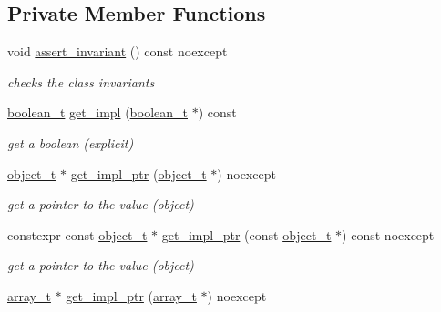 \subsection*{Private Member Functions}
\begin{DoxyCompactItemize}
\item 
void \hyperlink{classnlohmann_1_1basic__json_a4a82d3fb7a111641decf35c2fb707c7f}{assert\+\_\+invariant} () const noexcept
\begin{DoxyCompactList}\small\item\em checks the class invariants \end{DoxyCompactList}\item 
\hyperlink{classnlohmann_1_1basic__json_a4c919102a9b4fe0d588af64801436082}{boolean\+\_\+t} \hyperlink{classnlohmann_1_1basic__json_acb296a56f69c396e2c2a898f2043c834}{get\+\_\+impl} (\hyperlink{classnlohmann_1_1basic__json_a4c919102a9b4fe0d588af64801436082}{boolean\+\_\+t} $\ast$) const 
\begin{DoxyCompactList}\small\item\em get a boolean (explicit) \end{DoxyCompactList}\item 
\hyperlink{classnlohmann_1_1basic__json_a0322396ca5cd4623bc816bf735377623}{object\+\_\+t} $\ast$ \hyperlink{classnlohmann_1_1basic__json_a58b65f595883fb93333423ec5e3bafee}{get\+\_\+impl\+\_\+ptr} (\hyperlink{classnlohmann_1_1basic__json_a0322396ca5cd4623bc816bf735377623}{object\+\_\+t} $\ast$) noexcept
\begin{DoxyCompactList}\small\item\em get a pointer to the value (object) \end{DoxyCompactList}\item 
constexpr const \hyperlink{classnlohmann_1_1basic__json_a0322396ca5cd4623bc816bf735377623}{object\+\_\+t} $\ast$ \hyperlink{classnlohmann_1_1basic__json_aff66aa31ef8603d799433b26fe7535c9}{get\+\_\+impl\+\_\+ptr} (const \hyperlink{classnlohmann_1_1basic__json_a0322396ca5cd4623bc816bf735377623}{object\+\_\+t} $\ast$) const noexcept
\begin{DoxyCompactList}\small\item\em get a pointer to the value (object) \end{DoxyCompactList}\item 
\hyperlink{classnlohmann_1_1basic__json_a4c409f1b6d9caf3412c78af9a5883fed}{array\+\_\+t} $\ast$ \hyperlink{classnlohmann_1_1basic__json_a0a9c36d4d94ef5d611c0204bc7e4d37f}{get\+\_\+impl\+\_\+ptr} (\hyperlink{classnlohmann_1_1basic__json_a4c409f1b6d9caf3412c78af9a5883fed}{array\+\_\+t} $\ast$) noexcept

\end{DoxyCompactItemize}
